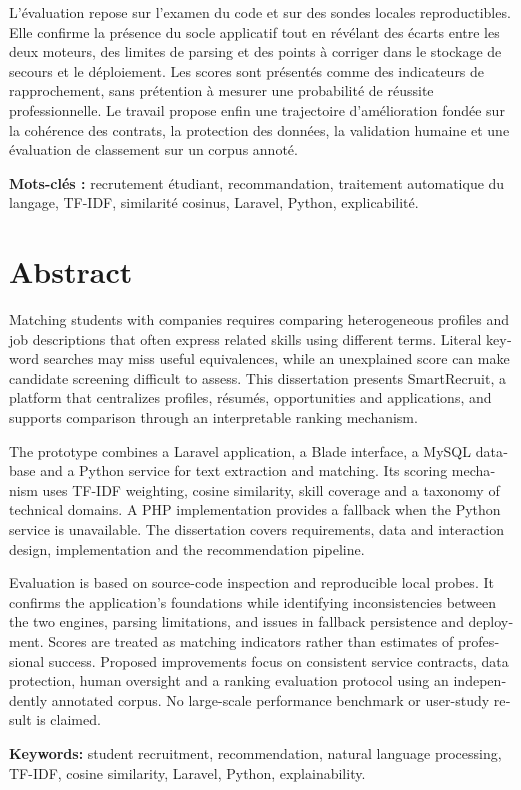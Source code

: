 L'évaluation repose sur l'examen du code et sur des sondes locales reproductibles. Elle confirme la présence du socle applicatif tout en révélant des écarts entre les deux moteurs, des limites de parsing et des points à corriger dans le stockage de secours et le déploiement. Les scores sont présentés comme des indicateurs de rapprochement, sans prétention à mesurer une probabilité de réussite professionnelle. Le travail propose enfin une trajectoire d'amélioration fondée sur la cohérence des contrats, la protection des données, la validation humaine et une évaluation de classement sur un corpus annoté.

\noindent\textbf{Mots-clés :} recrutement étudiant, recommandation, traitement automatique du langage, TF-IDF, similarité cosinus, Laravel, Python, explicabilité.

\chapter*{Abstract}
\begin{otherlanguage}{english}
Matching students with companies requires comparing heterogeneous profiles and job descriptions that often express related skills using different terms. Literal keyword searches may miss useful equivalences, while an unexplained score can make candidate screening difficult to assess. This dissertation presents SmartRecruit, a platform that centralizes profiles, résumés, opportunities and applications, and supports comparison through an interpretable ranking mechanism.

The prototype combines a Laravel application, a Blade interface, a MySQL database and a Python service for text extraction and matching. Its scoring mechanism uses TF-IDF weighting, cosine similarity, skill coverage and a taxonomy of technical domains. A PHP implementation provides a fallback when the Python service is unavailable. The dissertation covers requirements, data and interaction design, implementation and the recommendation pipeline.

Evaluation is based on source-code inspection and reproducible local probes. It confirms the application's foundations while identifying inconsistencies between the two engines, parsing limitations, and issues in fallback persistence and deployment. Scores are treated as matching indicators rather than estimates of professional success. Proposed improvements focus on consistent service contracts, data protection, human oversight and a ranking evaluation protocol using an independently annotated corpus. No large-scale performance benchmark or user-study result is claimed.

\noindent\textbf{Keywords:} student recruitment, recommendation, natural language processing, TF-IDF, cosine similarity, Laravel, Python, explainability.
\end{otherlanguage}

